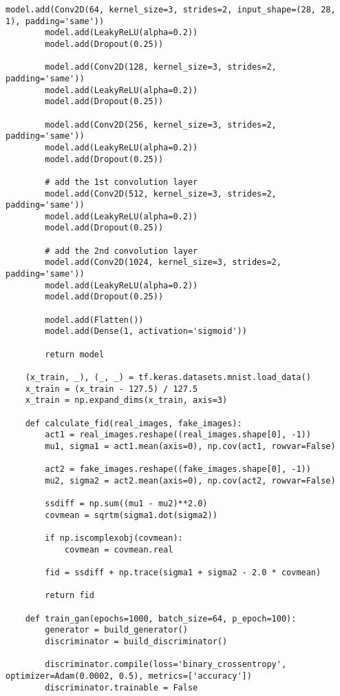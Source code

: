 \begin{lstlisting}[style=mypython, caption=Explore GAN with more convolutional layers 5]
        model.add(Conv2D(64, kernel_size=3, strides=2, input_shape=(28, 28, 1), padding='same'))
        model.add(LeakyReLU(alpha=0.2))
        model.add(Dropout(0.25))
    
        model.add(Conv2D(128, kernel_size=3, strides=2, padding='same'))
        model.add(LeakyReLU(alpha=0.2))
        model.add(Dropout(0.25))
    
        model.add(Conv2D(256, kernel_size=3, strides=2, padding='same'))
        model.add(LeakyReLU(alpha=0.2))
        model.add(Dropout(0.25))
    
        # add the 1st convolution layer
        model.add(Conv2D(512, kernel_size=3, strides=2, padding='same'))
        model.add(LeakyReLU(alpha=0.2))
        model.add(Dropout(0.25))
    
        # add the 2nd convolution layer
        model.add(Conv2D(1024, kernel_size=3, strides=2, padding='same'))
        model.add(LeakyReLU(alpha=0.2))
        model.add(Dropout(0.25))
    
        model.add(Flatten())
        model.add(Dense(1, activation='sigmoid'))
    
        return model
    
    (x_train, _), (_, _) = tf.keras.datasets.mnist.load_data()
    x_train = (x_train - 127.5) / 127.5
    x_train = np.expand_dims(x_train, axis=3)
    
    def calculate_fid(real_images, fake_images):
        act1 = real_images.reshape((real_images.shape[0], -1))
        mu1, sigma1 = act1.mean(axis=0), np.cov(act1, rowvar=False)
        
        act2 = fake_images.reshape((fake_images.shape[0], -1))
        mu2, sigma2 = act2.mean(axis=0), np.cov(act2, rowvar=False)
        
        ssdiff = np.sum((mu1 - mu2)**2.0)
        covmean = sqrtm(sigma1.dot(sigma2))
        
        if np.iscomplexobj(covmean):
            covmean = covmean.real
        
        fid = ssdiff + np.trace(sigma1 + sigma2 - 2.0 * covmean)
        
        return fid
    
    def train_gan(epochs=1000, batch_size=64, p_epoch=100):
        generator = build_generator()
        discriminator = build_discriminator()
    
        discriminator.compile(loss='binary_crossentropy', optimizer=Adam(0.0002, 0.5), metrics=['accuracy'])
        discriminator.trainable = False
    

\end{lstlisting}
